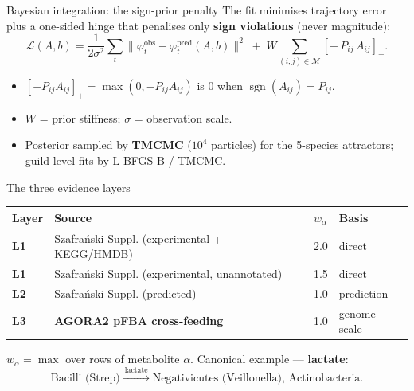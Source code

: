 \documentclass[
  ignorenonframetext,
  aspectratio=169,
]{beamer}
\providecommand{\tightlist}{%
  \setlength{\itemsep}{0pt}\setlength{\parskip}{0pt}}
\begin{document}
\begin{frame}{Bayesian integration: the sign-prior penalty}
\protect\hypertarget{bayesian-integration-the-sign-prior-penalty}{}
The fit minimises trajectory error plus a one-sided hinge that penalises
only \textbf{sign violations} (never magnitude):
\[\mathcal{L}(A,b) = \frac{1}{2\sigma^{2}}\sum_{t}\big\lVert \varphi^{\text{obs}}_{t}-\varphi^{\text{pred}}_{t}(A,b)\big\rVert^{2}
\;+\; W\!\!\sum_{(i,j)\in\mathcal{M}}\!\! \left[-\,P_{ij}\,A_{ij}\right]_{+} .\]

\begin{itemize}
\tightlist
\item
  \(\left[-P_{ij}A_{ij}\right]_{+}=\max(0,-P_{ij}A_{ij})\) is \(0\) when
  \(\operatorname{sgn}(A_{ij})=P_{ij}\).
\item
  \(W\) = prior stiffness; \(\sigma\) = observation scale.
\item
  Posterior sampled by \textbf{TMCMC} (\(10^4\) particles) for the
  5-species attractors; guild-level fits by L-BFGS-B / TMCMC.
\end{itemize}
\end{frame}

\begin{frame}{The three evidence layers}
\protect\hypertarget{the-three-evidence-layers}{}
\begin{longtable}[]{@{}llll@{}}
\toprule
Layer & Source & \(w_\alpha\) & Basis \\
\midrule
\endhead
\textbf{L1} & Szafrański Suppl. (experimental + KEGG/HMDB) & 2.0 &
direct \\
\textbf{L1} & Szafrański Suppl. (experimental, unannotated) & 1.5 &
direct \\
\textbf{L2} & Szafrański Suppl. (predicted) & 1.0 & prediction \\
\textbf{L3} & \textbf{AGORA2 pFBA cross-feeding} & 1.0 & genome-scale \\
\bottomrule
\end{longtable}

\(w_\alpha=\max\) over rows of metabolite \(\alpha\). Canonical example
--- \textbf{lactate}:
\[\text{Bacilli (Strep)} \xrightarrow{\ \text{lactate}\ } \text{Negativicutes (Veillonella), Actinobacteria}.\]
\end{frame}
\end{document}
